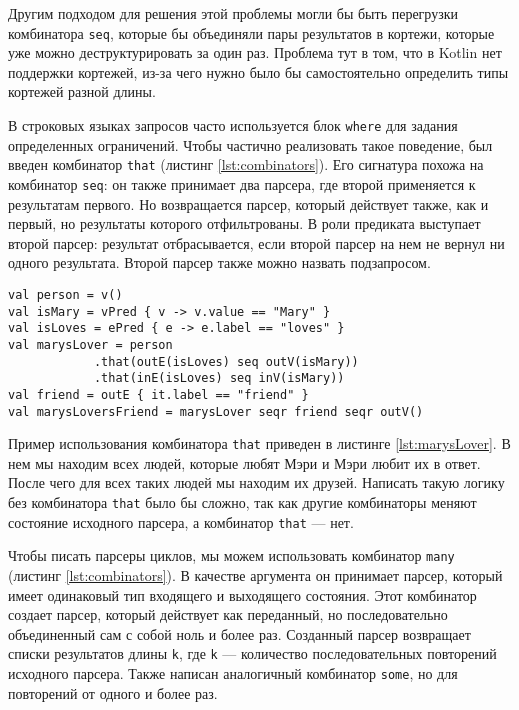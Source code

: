 Другим подходом для решения этой проблемы могли бы быть перегрузки комбинатора \verb|seq|, которые бы объединяли пары результатов в кортежи, которые уже можно деструктурировать за один раз. Проблема тут в том, что в Kotlin нет поддержки кортежей, из-за чего нужно было бы самостоятельно определить типы кортежей разной длины.

В строковых языках запросов часто используется блок \texttt{where} для задания определенных ограничений. Чтобы частично реализовать такое поведение, был введен комбинатор \texttt{that} (листинг \ref{lst:combinators}). Его сигнатура похожа на комбинатор \texttt{seq}: он также принимает два парсера, где второй применяется к результатам первого. Но возвращается парсер, который действует также, как и первый, но результаты которого отфильтрованы. В роли предиката выступает второй парсер: результат отбрасывается, если второй парсер на нем не вернул ни одного результата. Второй парсер также можно назвать подзапросом.


\begin{lstlisting}[float=ht, label=lst:marysLover, caption={Пример запроса к графу с комбинатором \texttt{that}}]
val person = v()
val isMary = vPred { v -> v.value == "Mary" }
val isLoves = ePred { e -> e.label == "loves" }
val marysLover = person
            .that(outE(isLoves) seq outV(isMary))
            .that(inE(isLoves) seq inV(isMary))
val friend = outE { it.label == "friend" }
val marysLoversFriend = marysLover seqr friend seqr outV()
\end{lstlisting}

Пример использования комбинатора \texttt{that} приведен в листинге \ref{lst:marysLover}. В нем мы находим всех людей, которые любят Мэри и Мэри любит их в ответ. После чего для всех таких людей мы находим их друзей. Написать такую логику без комбинатора \texttt{that} было бы сложно, так как другие комбинаторы меняют состояние исходного парсера, а комбинатор \texttt{that} --- нет.

Чтобы писать парсеры циклов, мы можем использовать комбинатор \texttt{many} (листинг \ref{lst:combinators}).
В качестве аргумента он принимает парсер, который имеет одинаковый тип входящего и выходящего состояния.
Этот комбинатор создает парсер, который действует как переданный, но последовательно объединенный сам с собой ноль и более раз.
Созданный парсер возвращает списки результатов длины \texttt{k}, где \texttt{k} --- количество последовательных повторений исходного парсера.
Также написан аналогичный комбинатор \texttt{some}, но для повторений от одного и более раз.

